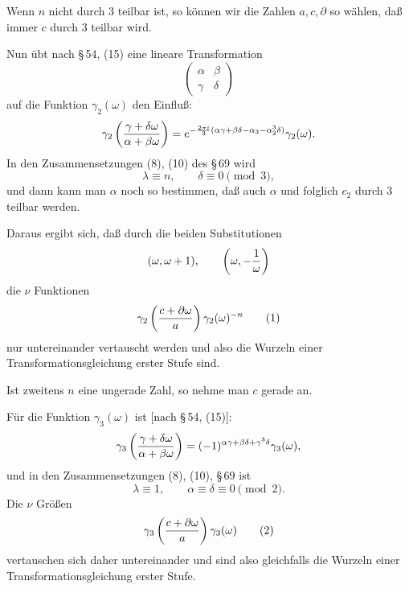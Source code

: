 \documentclass[11pt]{article}
\begin{document}
Wenn $n$ nicht durch $3$ teilbar ist, so können wir die Zahlen $a,c,\partial$ so wählen, daß immer $c$ durch $3$ teilbar wird.

Nun übt nach \S\,54, (15) eine lineare Transformation
\[
\begin{pmatrix}\alpha&\beta\\ \gamma&\delta\end{pmatrix}
\]
auf die Funktion $\gamma_2(\omega)$ den Einfluß:
\[
 \gamma_2\left({\gamma+\delta\omega\over\alpha+\beta\omega}\right)
 =e^{-{2\pi i\over3}(\alpha\gamma+\beta\delta-\alpha_3-\alpha_2^3\delta)}\gamma_2(\omega).
\]
In den Zusammensetzungen (8), (10) des \S\,69 wird
\[
 \lambda\equiv n,
 \qquad
 \delta\equiv0\pmod3,
\]
und dann kann man $\alpha$ noch so bestimmen, daß auch $\alpha$ und folglich $c_2$ durch $3$ teilbar werden.

Daraus ergibt sich, daß durch die beiden Substitutionen
\[
 (\omega,\omega+1),
 \qquad
 \left(\omega,-{1\over\omega}\right)
\]
die $\nu$ Funktionen
\begin{equation}
 \gamma_2\left({c+\partial\omega\over a}\right)\gamma_2(\omega)^{-n}
\tag{1}
\end{equation}
nur untereinander vertauscht werden und also die Wurzeln einer Transformationsgleichung erster Stufe sind.

Ist zweitens $n$ eine ungerade Zahl, so nehme man $c$ gerade an.

Für die Funktion $\gamma_3(\omega)$ ist [nach \S\,54, (15)]:
\[
 \gamma_3\left({\gamma+\delta\omega\over\alpha+\beta\omega}\right)
 =(-1)^{\alpha\gamma+\beta\delta+\gamma^3\delta}\gamma_3(\omega),
\]
und in den Zusammensetzungen (8), (10), \S\,69 ist
\[
 \lambda\equiv1,
 \qquad
 \alpha\equiv\delta\equiv0\pmod2.
\]
Die $\nu$ Größen
\begin{equation}
 \gamma_3\left({c+\partial\omega\over a}\right)\gamma_3(\omega)
\tag{2}
\end{equation}
vertauschen sich daher untereinander und sind also gleichfalls die Wurzeln einer Transformationsgleichung erster Stufe.
\end{document}
